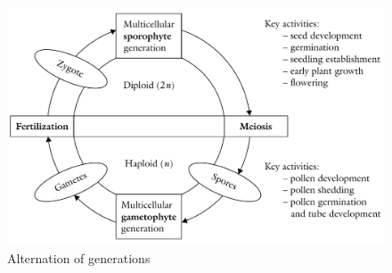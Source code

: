 \documentclass[11pt,ignorenonframetext,aspectratio=169]{beamer}
\begin{document}
\begin{frame}{}
\protect\hypertarget{section-4}{}
\begin{figure}

{\centering \includegraphics[width=0.6\linewidth]{./images/alternation_of_generations} 

}

\caption{Alternation of generations}\label{fig:alternation-generation}
\end{figure}
\end{frame}
\end{document}
